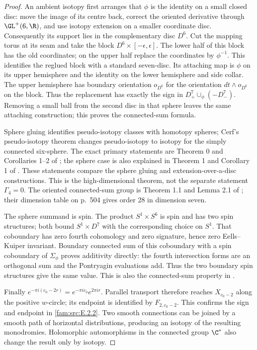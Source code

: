 \begin{proof}
An ambient isotopy first arranges that $\phi$ is the identity on a
small closed disc: move the image of its centre back, correct the
oriented derivative through $\GL^+(6,\R)$, and use isotopy extension
on a smaller coordinate disc. Consequently its support lies in the
complementary disc $D^6$. Cut the mapping torus at its seam and take
the block $D^6\times[-\epsilon,\epsilon]$. The lower half of this
block has the old coordinates; on the upper half replace the
coordinates by $\phi^{-1}$. This identifies the reglued block with a
standard seven-disc. Its attaching map is $\phi$ on its upper
hemisphere and the identity on the lower hemisphere and side collar.
The upper hemisphere has boundary orientation $o_{D^6}$ for the
orientation $dt\wedge o_{D^6}$ on the block. Thus the replacement
has exactly the sign in $D^7_+\cup_\phi(-D^7_-)$.
Removing a small ball from the second disc in that sphere leaves the
same attaching construction; this proves the connected-sum formula.

Sphere gluing identifies pseudo-isotopy classes with homotopy spheres;
Cerf's pseudo-isotopy theorem changes pseudo-isotopy to isotopy for
the simply connected six-sphere. The exact primary statements are
Theorem 0 and Corollaries 1--2 of \citet[p.~8]{Cerf1970};
the sphere case is also explained in Theorem 1 and Corollary 1 of
\citet[p.~156]{Poenaru1971}. These statements compare the
sphere gluing and extension-over-a-disc constructions. This is the
high-dimensional theorem, not the separate statement $\Gamma_4=0$.
The oriented connected-sum group is Theorem 1.1 and Lemma 2.1 of
\citet[pp.~504--505]{KervaireMilnor1963}; their dimension table on
p.~504 gives order 28 in dimension seven.

The sphere summand is spin. The product $S^1\times S^6$ is spin and
has two spin structures; both bound $S^1\times D^7$ with the
corresponding choice on $S^1$. That coboundary has zero fourth
cohomology and zero signature, hence zero Eells--Kuiper invariant.
Boundary connected sum of this coboundary with a spin coboundary of
$\Sigma_\phi$ proves additivity directly: the fourth intersection
forms are an orthogonal sum and the Pontryagin evaluations add.
Thus the two boundary spin structures give the same value. This is
also the connected-sum property in \citet[Section 3]{EellsKuiper1962}.

Finally $e^{-\pi i(c_0-2r)}=e^{-\pi ic_0}e^{2\pi ir}$.
Parallel transport therefore reaches $X_{c_0-2}$ along the positive
$w$-circle; its endpoint is identified by $F_{2,c_0-2}$.
This confirms the sign and endpoint in \cref{fam:src:E.2.2}. Two smooth connections
can be joined by a smooth path of horizontal distributions, producing
an isotopy of the resulting monodromies. Holomorphic automorphisms in
the connected group $\C^*$ also change the result only by isotopy.
\end{proof}

